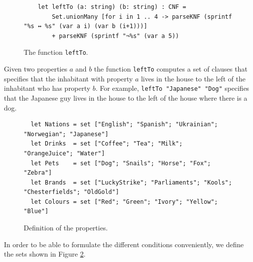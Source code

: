 \begin{figure}[!ht]
\centering
\begin{verbatim}
    let leftTo (a: string) (b: string) : CNF =
        Set.unionMany [for i in 1 .. 4 -> parseKNF (sprintf "%s ↔ %s" (var a i) (var b (i+1)))]
        + parseKNF (sprintf "¬%s" (var a 5))
\end{verbatim}
\vspace*{-0.3cm}
\caption{The function \texttt{leftTo}.}
\label{fig:leftTo}
\end{figure}

Given two properties $a$ and $b$ the function \texttt{leftTo} computes a
set of clauses that specifies that the inhabitant with property $a$ lives in
the house to the left of the inhabitant who has property $b$.  For example,
\texttt{leftTo "Japanese" "Dog"} specifies that the
Japanese guy lives in the house to the left of the house where there is a dog.

\begin{figure}[!ht]
\centering
\begin{verbatim}
  let Nations = set ["English"; "Spanish"; "Ukrainian"; "Norwegian"; "Japanese"]
  let Drinks  = set ["Coffee"; "Tea"; "Milk"; "OrangeJuice"; "Water"]
  let Pets    = set ["Dog"; "Snails"; "Horse"; "Fox"; "Zebra"]
  let Brands  = set ["LuckyStrike"; "Parliaments"; "Kools"; "Chesterfields"; "OldGold"]
  let Colours = set ["Red"; "Green"; "Ivory"; "Yellow"; "Blue"]
\end{verbatim}
\vspace*{-0.3cm}
\caption{Definition of the properties.}
\label{fig:properties}
\end{figure}

In order to be able to formulate the different conditions conveniently, we define the sets
shown in Figure \ref{fig:properties}.

